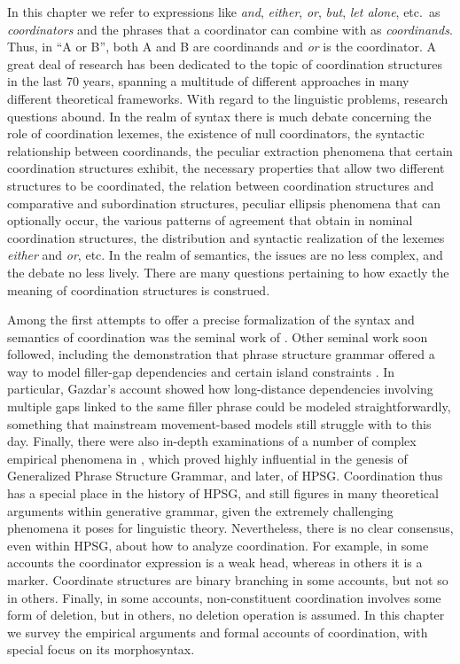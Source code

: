 In this chapter we refer to expressions like \emph{and}, \emph{either},  \emph{or}, \emph{but}, 
\emph{let alone}, etc.\ as \emph{coordinators} and the phrases that a coordinator can combine with as  \emph{coordinands}.
Thus,  in ``A or B'', both A and B are coordinands and \emph{or} is the coordinator. 
A great deal of research has been dedicated to the topic of coordination structures in the last  70 years, spanning a multitude of different approaches in many different theoretical frameworks.  With regard to the linguistic problems, research questions abound. In the realm of syntax there is much debate concerning the role of coordination lexemes, the existence of null coordinators, the syntactic relationship between coordinands, the peculiar extraction phenomena that certain coordination structures exhibit, the necessary properties that allow two different structures to be coordinated, the relation between coordination structures and comparative and subordination structures, peculiar ellipsis phenomena that can optionally occur, the various patterns of agreement that obtain in nominal coordination structures, the distribution and syntactic realization of the lexemes \emph{either} and \emph{or}, etc. In the realm of semantics, the issues are no less complex, and the debate no less lively. There are many questions pertaining to how exactly the meaning of coordination structures is construed. 

Among the first attempts to offer a precise formalization of the syntax and semantics of coordination was the seminal work of \citet{gazdarc}. Other seminal work soon followed, including the demonstration that phrase structure grammar offered a way to model filler-gap dependencies and certain island constraints \citep{gazdar}. In particular, Gazdar's account showed how long-distance dependencies involving multiple gaps linked to the same filler phrase could be modeled straightforwardly, something that mainstream movement-based models still struggle with to this day. Finally, there were also 
 in-depth examinations of a number of complex empirical phenomena in  \citet{gazd1982}, which  proved highly influential in the genesis of Generalized Phrase Structure Grammar, and later, of HPSG. Coordination thus has a special place in the history of HPSG, and still figures  in many theoretical arguments within generative grammar,  given the extremely challenging phenomena it poses for linguistic theory. 
Nevertheless, there is no clear consensus, even within HPSG, about how to analyze coordination. For example, in some accounts the coordinator
expression is a weak head, whereas in others it is a marker. Coordinate structures are binary branching in some accounts, but not so in others. Finally, in  some accounts, non-constituent coordination involves some form of deletion, but in others, no deletion operation is assumed.  
In this chapter we survey the empirical arguments and formal accounts of coordination, with special focus on its morphosyntax.

